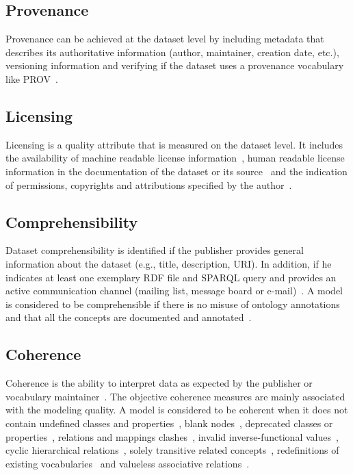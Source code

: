 \documentclass[onecolumn, crcready]{../../Tools/LaTEX/iosart2c}
\begin{document}
\subsection{Provenance}
Provenance can be achieved at the dataset level by including metadata that describes its authoritative information (author, maintainer, creation date, etc.), versioning information and verifying if the dataset uses a provenance vocabulary like PROV~\cite{Lebo:W3C:13}.

\subsection{Licensing}
Licensing is a quality attribute that is measured on the dataset level. It includes the availability of machine readable license information~\cite{Hogan:WebSemJorunal:12}, human readable license information in the documentation of the dataset or its source~\cite{Hogan:WebSemJorunal:12} and the indication of permissions, copyrights and attributions specified by the author~\cite{Zaveri:SemWebJorunal:12}.

\subsection{Comprehensibility}
Dataset comprehensibility is identified if the publisher provides general information about the dataset (e.g., title, description, URI). In addition, if he indicates at least one exemplary RDF file and SPARQL query and provides an active communication channel (mailing list, message board or e-mail)~\cite{Flemming:Thesis:10}. A model is considered to be comprehensible if there is no misuse of ontology annotations and that all the concepts are documented and annotated~\cite{Mader:TBDL:12,Maria:KEOD:13}.

\subsection{Coherence}
Coherence is the ability to interpret data as expected by the publisher or vocabulary maintainer~\cite{Hogan:LDOW:10}. The objective coherence measures are mainly associated with the modeling quality. A model is considered to be coherent when it does not contain undefined classes and properties~\cite{Hogan:LDOW:10}, blank nodes~\cite{Hogan:WebSemJorunal:12}, deprecated classes or properties~\cite{Hogan:LDOW:10}, relations and mappings clashes~\cite{Suominen:IKEM:12}, invalid inverse-functional values~\cite{Hogan:LDOW:10}, cyclic hierarchical relations~\cite{Dagobert:DL:02,Suominen:IKEM:12,Mader:TBDL:12}, solely transitive related concepts~\cite{Mader:TBDL:12}, redefinitions of existing vocabularies~\cite{Hogan:LDOW:10} and valueless associative relations~\cite{Mader:TBDL:12}.
\end{document}
